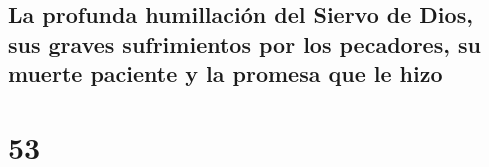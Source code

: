 \hypertarget{la-profunda-humillaciuxf3n-del-siervo-de-dios-sus-graves-sufrimientos-por-los-pecadores-su-muerte-paciente-y-la-promesa-que-le-hizo}{%
\subsection{La profunda humillación del Siervo de Dios, sus graves
sufrimientos por los pecadores, su muerte paciente y la promesa que le
hizo}\label{la-profunda-humillaciuxf3n-del-siervo-de-dios-sus-graves-sufrimientos-por-los-pecadores-su-muerte-paciente-y-la-promesa-que-le-hizo}}

\hypertarget{section-52}{%
\section{53}\label{section-52}}

